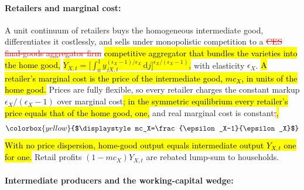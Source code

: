\paragraph{Retailers and marginal cost:}
A unit continuum of retailers buys the homogeneous intermediate good, differentiates it costlessly, and sells under monopolistic competition to a \textcolor{red}{\st{CES final-goods aggregator firm}} \hl{competitive aggregator that bundles the varieties into the home good,} \colorbox{yellow}{$Y_{X,t}=\bigl[\int_0^1 y_{jX,t}^{(\epsilon_X-1)/\epsilon_X}\,\mathrm{d}j\bigr]^{\epsilon_X/(\epsilon_X-1)}$}\hl{,} with elasticity $\epsilon_X$. \hl{A retailer's marginal cost is the price of the intermediate good, $mc_X$, in units of the home good.} Prices are fully flexible, so every retailer charges the constant markup $\epsilon_X/(\epsilon_X-1)$ over marginal cost\hl{; in the symmetric equilibrium every retailer's price equals that of the home good, one,} and real marginal cost is constant\textcolor{red}{\st{;}}\hl{,}
\begin{equation}
\colorbox{yellow}{$\displaystyle mc_X=\frac{\epsilon_X-1}{\epsilon_X}$}
\label{eq:mc}
\end{equation}
\hl{With no price dispersion, home-good output equals intermediate output $Y_{X,t}$ one for one.} Retail profits $(1-mc_X)Y_{X,t}$ are rebated lump-sum to households.

\paragraph{Intermediate producers and the working-capital wedge:}
\label{sec:wc}

